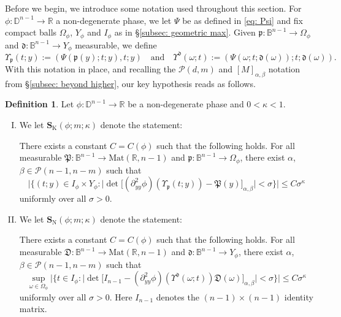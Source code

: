 \documentclass[reqno]{amsart}
\numberwithin{equation}{section}
\newcommand{\B}{\mathbb{B}}
\newcommand{\D}{\mathbb{D}}
\newcommand{\R}{\mathbb{R}}
\newcommand{\cP}{\mathcal{P}}
\newcommand{\bS}{\mathbf{S}}
\newcommand{\fd}{\mathfrak{d}}
\newcommand{\fD}{\mathfrak{D}}
\newcommand{\fp}{\mathfrak{p}}
\newcommand{\fP}{\mathfrak{P}}
\theoremstyle{plain}
\theoremstyle{definition}
\newtheorem{definition}[theorem]{Definition}
\newcommand{\tK}{\mathrm{K}}
\newcommand{\tN}{\mathrm{N}}
\begin{document}
Before we begin, we introduce some notation used throughout this section. For $\phi \colon \D^{n-1} \to \R$ a non-degenerate phase, we let $\Psi$ be as defined in \eqref{eq: Psi} and fix compact balls $\Omega_{\phi}$, $Y_{\phi}$ and $I_{\phi}$ as in \S\ref{subsec: geometric max}. Given $\fp \colon \B^{n-1} \to \Omega_{\phi}$ and  $\fd \colon \B^{n-1} \to Y_{\phi}$ measurable, we define
\begin{equation}\label{eq: Upsilon}
   \Upsilon_{\fp}(t;y):=(\Psi(\fp(y);t;y), t ;y) \quad \textrm{and} \quad \Upsilon^{\fd}(\omega;t) := (\Psi(\omega;t;\fd(\omega));t;\fd(\omega)).
\end{equation}
With this notation in place, and recalling the $\cP(d, m)$ and $[M]_{\alpha, \beta}$ notation from \S\ref{subsec: beyond higher}, our key hypothesis reads as follows. 

\begin{definition}\label{dfn: hyp K N} Let $\phi \colon \D^{n-1} \to \R$ be a non-degenerate phase and $0 < \kappa < 1$.

\begin{enumerate}[I)]
    \item We let $\bS_{\tK}(\phi; m; \kappa)$ denote the statement:\medskip 

\noindent There exists a constant $C=C(\phi)$ such that the following holds. For all measurable $\fP \colon \B^{n-1} \to \mathrm{Mat}(\R, n-1)$ and $\fp \colon \B^{n-1} \to \Omega_{\phi}$, there exist $\alpha$, $\beta \in \cP(n-1,n-m)$ such that
\begin{equation*}
    \Big|\Big\{ (t;y) \in I_{\phi} \times Y_{\phi} : \Big|\det\Big[ (\partial_{yy}^2 \phi)(\Upsilon_{\fp}(t;y)) - \fP(y)\Big]_{\alpha, \beta}\Big| < \sigma \Big\}\Big| \leq C  \sigma^{\kappa}
\end{equation*}
uniformly over all $\sigma > 0$.\medskip


\item We let $\bS_{\tN}(\phi; m; \kappa)$ denote the statement: \medskip

\noindent There exists a constant $C=C(\phi)$ such that the following holds. For all measurable $\fD \colon \B^{n-1} \to \mathrm{Mat}(\R, n-1)$ and $\fd \colon \B^{n-1} \to Y_{\phi}$, there exist $\alpha$, $\beta \in \cP(n-1,n-m)$ such that
\begin{equation*}
    \sup_{\omega \in \Omega_{\phi}} \Big|\Big\{ t \in I_{\phi} : \Big|{\det}\Big[ I_{n-1}-
 (\partial_{yy}^2 \phi)(\Upsilon^{\fd}(\omega;t))\fD(\omega)\Big]_{\alpha, \beta} \Big| < \sigma \Big\}\Big| \leq C\sigma^{\kappa}
\end{equation*}
uniformly over all $\sigma > 0$. Here $I_{n-1}$ denotes the $(n-1)\times (n-1)$ identity matrix. \medskip
\end{enumerate} 
\end{definition}
\end{document}
